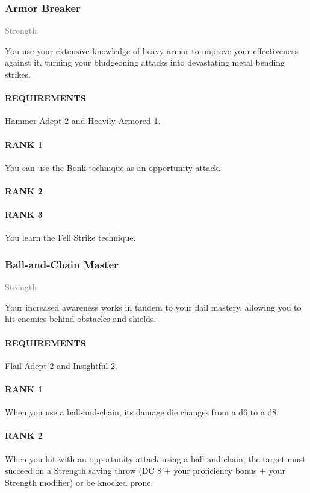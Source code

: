 \subsubsection{Armor Breaker} \label{feat::armorbreaker}
\small{\textcolor{gray}{Strength}}

\normalsize
You use your extensive knowledge of heavy armor to improve your effectiveness against it, turning your bludgeoning attacks into devastating metal bending strikes.
\paragraph{REQUIREMENTS} Hammer Adept 2 and Heavily Armored 1.
\paragraph{RANK 1} You can use the Bonk technique as an opportunity attack.
\paragraph{RANK 2}
\paragraph{RANK 3} You learn the Fell Strike technique.

\subsubsection{Ball-and-Chain Master} \label{feat::ballandchainmaster}
\small{\textcolor{gray}{Strength}}

\normalsize
Your increased awareness works in tandem to your flail mastery, allowing you to hit enemies behind obstacles and shields.
\paragraph{REQUIREMENTS} Flail Adept 2 and Insightful 2.
\paragraph{RANK 1} When you use a ball-and-chain, its damage die changes from a d6 to a d8.
\paragraph{RANK 2} When you hit with an opportunity attack using a ball-and-chain, the target must succeed on a Strength saving throw (DC 8 + your proficiency bonus + your Strength modifier) or be knocked prone.
